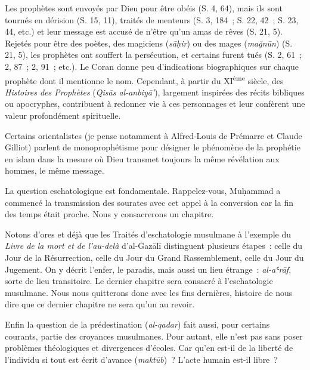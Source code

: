 Les prophètes sont envoyés par Dieu pour être obéis (S. 4, 64), mais ils
sont tournés en dérision (S. 15, 11), traités de menteurs (S. 3, 184~;
S. 22, 42~; S. 23, 44, etc.) et leur message est accusé de n'être qu'un
amas de rêves (S. 21, 5). Rejetés pour être des poètes, des magiciens
(\emph{sāḥir}) ou des mages (\emph{maǧnūn}) (S. 21, 5), les prophètes
ont souffert la persécution, et certains furent tués (S. 2, 61~; 2, 87~;
2, 91~; etc.). Le Coran donne peu d'indications biographiques sur chaque
prophète dont il mentionne le nom. Cependant, à partir du
XI\textsuperscript{ème} siècle, des \emph{Histoires des Prophètes}
(\emph{Qisās al-anbiyā'}), largement inspirées des récits bibliques ou
apocryphes, contribuent à redonner vie à ces personnages et leur
confèrent une valeur profondément spirituelle.

Certains orientalistes (je pense notamment à Alfred-Louis de Prémarre et
Claude Gilliot) parlent de monoprophétisme pour désigner le phénomène de
la prophétie en islam dans la mesure où Dieu transmet toujours la même
révélation aux hommes, le même message.


La question eschatologique est fondamentale. Rappelez-vous, Muḥammad a
commencé la transmission des sourates avec cet appel à la conversion car
la fin des temps était proche. Nous y consacrerons un chapitre.

Notons d'ores et déjà que les Traités d'eschatologie musulmane à
l'exemple du \emph{Livre de la mort et de l'au-delà} d'al-Ġazālī
distinguent plusieurs étapes~: celle du Jour de la Résurrection, celle
du Jour du Grand Rassemblement, celle du Jour du Jugement. On y décrit
l'enfer, le paradis, mais aussi un lieu étrange~: \emph{al-aʿrāf}, sorte
de lieu transitoire. Le dernier chapitre sera consacré à l'eschatologie
musulmane. Nous nous quitterons donc avec les fins dernières, histoire
de nous dire que ce dernier chapitre ne sera qu'un au revoir.


Enfin la question de la prédestination (\emph{al-qadar}) fait aussi,
pour certains courants, partie des croyances musulmanes. Pour autant,
elle n'est pas sans poser problèmes théologiques et divergences
d'écoles. Car qu'en est-il de la liberté de l'individu si tout est écrit
d'avance (\emph{maktūb})~? L'acte humain est-il libre~?

